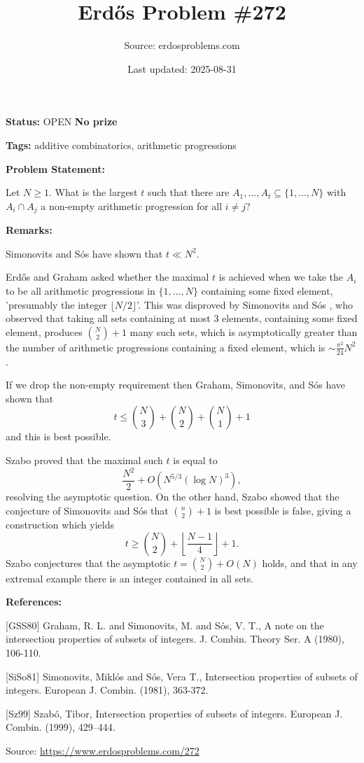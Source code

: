 \documentclass{article}
\title{Erd\H{o}s Problem \#272}
\date{Last updated: 2025-08-31}
\author{Source: erdosproblems.com}
\begin{document}
\maketitle

\noindent\textbf{Status:} OPEN \quad \textbf{No prize}

\noindent\textbf{Tags:} additive combinatorics, arithmetic progressions

\medskip
\noindent\textbf{Problem Statement:}

Let $N\geq 1$. What is the largest $t$ such that there are $A_1,\ldots,A_t\subseteq \{1,\ldots,N\}$ with $A_i\cap A_j$ a non-empty arithmetic progression for all $i\neq j$?

\bigskip
\noindent\textbf{Remarks:}

Simonovits and S\'{o}s \cite{SiSo81} have shown that $t\ll N^2$.

Erd\H{o}s and Graham asked whether the maximal $t$ is achieved when we take the $A_i$ to be all arithmetic progressions in $\{1,\ldots,N\}$ containing some fixed element, 'presumably the integer $\lfloor N/2\rfloor$'. This was disproved by Simonovits and S\'{o}s \cite{SiSo81}, who observed that taking all sets containing at most $3$ elements, containing some fixed element, produces $\binom{N}{2}+1$ many such sets, which is asymptotically greater than the number of arithmetic progressions containing a fixed element, which is $\sim \frac{\pi^2}{24}N^2$.

If we drop the non-empty requirement then Graham, Simonovits, and S\'{o}s \cite{GSS80} have shown that\[t\leq \binom{N}{3}+\binom{N}{2}+\binom{N}{1}+1\]and this is best possible.

Szabo \cite{Sz99} proved that the maximal such $t$ is equal to\[\frac{N^2}{2}+O(N^{5/3}(\log N)^3),\]resolving the asymptotic question. On the other hand, Szabo showed that the conjecture of Simonovits and S\'{o}s that $\binom{n}{2}+1$ is best possible is false, giving a construction which yields\[t \geq \binom{N}{2}+\left\lfloor\frac{N-1}{4}\right\rfloor+1.\]Szabo conjectures that the asymptotic $t=\binom{N}{2}+O(N)$ holds, and that in any extremal example there is an integer contained in all sets.

\bigskip
\noindent\textbf{References:}

[GSS80] Graham, R. L. and Simonovits, M. and S\'{o}s, V. T., A note on the intersection properties of subsets of integers. J. Combin. Theory Ser. A (1980), 106-110.
 
 [SiSo81] Simonovits, Mikl\'{o}s and S\'{o}s, Vera T., Intersection properties of subsets of integers. European J. Combin. (1981), 363-372.
 
 [Sz99] Szab\'o, Tibor, Intersection properties of subsets of integers. European J. Combin. (1999), 429--444.

\bigskip
\noindent\small{Source: \url{https://www.erdosproblems.com/272}}
\end{document}
